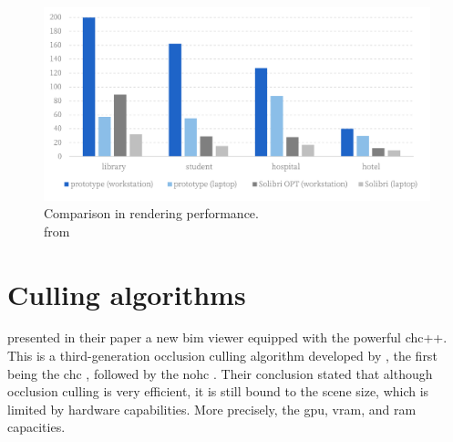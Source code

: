 \begin{figure}[H]
    \centering
    \includegraphics[width=\textwidth]{figures/pdf/JohanssonPerformances.pdf}
    \caption[Performance viewers]{Comparison in rendering performance.\\ from \cite{Johansson2015}}
    \label{fig:performanceJohansson}
\end{figure}

\section{Culling algorithms}\label{sec:historyCulling}
\cite{Johansson2015} presented in their paper a new \ac{bim} viewer equipped with the powerful \ac{chc}++. This is a third-generation occlusion culling algorithm developed by \cite{Mattausch2008}, the first being the \ac{chc} \parencite{Bittner2004}, followed by the \ac{nohc} \parencite{Michael2006}. Their conclusion stated that although occlusion culling is very efficient, it is still bound to the scene size, which is limited by hardware capabilities. More precisely, the \ac{gpu}, \ac{vram}, and \ac{ram} capacities.